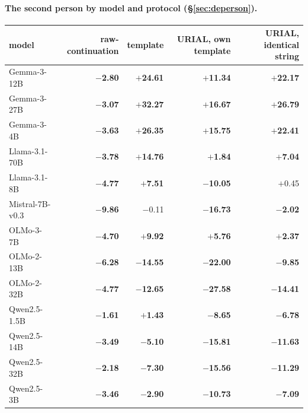 \paragraph*{The second person by model and protocol (\S\ref{sec:deperson}).}
\begin{center}\scriptsize\setlength{\tabcolsep}{4pt}
\begin{tabular}{lrrrr}\toprule
model & raw-continuation & template & URIAL, own template & URIAL, identical string \\ \midrule
Gemma-3-12B & \textbf{$-$2.80} & \textbf{$+$24.61} & \textbf{$+$11.34} & \textbf{$+$22.17} \\
Gemma-3-27B & \textbf{$-$3.07} & \textbf{$+$32.27} & \textbf{$+$16.67} & \textbf{$+$26.79} \\
Gemma-3-4B & \textbf{$-$3.63} & \textbf{$+$26.35} & \textbf{$+$15.75} & \textbf{$+$22.41} \\
Llama-3.1-70B & \textbf{$-$3.78} & \textbf{$+$14.76} & \textbf{$+$1.84} & \textbf{$+$7.04} \\
Llama-3.1-8B & \textbf{$-$4.77} & \textbf{$+$7.51} & \textbf{$-$10.05} & $+$0.45 \\
Mistral-7B-v0.3 & \textbf{$-$9.86} & $-$0.11 & \textbf{$-$16.73} & \textbf{$-$2.02} \\
OLMo-3-7B & \textbf{$-$4.70} & \textbf{$+$9.92} & \textbf{$+$5.76} & \textbf{$+$2.37} \\
OLMo-2-13B & \textbf{$-$6.28} & \textbf{$-$14.55} & \textbf{$-$22.00} & \textbf{$-$9.85} \\
OLMo-2-32B & \textbf{$-$4.77} & \textbf{$-$12.65} & \textbf{$-$27.58} & \textbf{$-$14.41} \\
Qwen2.5-1.5B & \textbf{$-$1.61} & \textbf{$+$1.43} & \textbf{$-$8.65} & \textbf{$-$6.78} \\
Qwen2.5-14B & \textbf{$-$3.49} & \textbf{$-$5.10} & \textbf{$-$15.81} & \textbf{$-$11.63} \\
Qwen2.5-32B & \textbf{$-$2.18} & \textbf{$-$7.30} & \textbf{$-$15.56} & \textbf{$-$11.29} \\
Qwen2.5-3B & \textbf{$-$3.46} & \textbf{$-$2.90} & \textbf{$-$10.73} & \textbf{$-$7.09} \\

\end{tabular}
\end{center}
